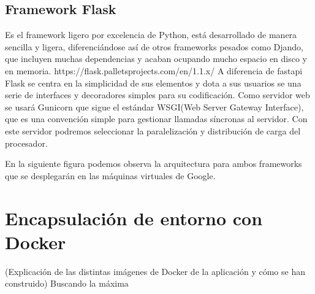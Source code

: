 \subsection{Framework Flask}\label{subsec:framework-flask}
Es el framework ligero por excelencia de Python, está desarrollado de manera sencilla y ligera, diferenciándose así de otros frameworks pesados como Djando, que incluyen
muchas dependencias y acaban ocupando mucho espacio en disco y en memoria.
https://flask.palletsprojects.com/en/1.1.x/
A diferencia de fastapi Flask se centra en la simplicidad de sus elementos y dota a sus usuarios se una serie de interfaces y decoradores simples para su codificación.
Como servidor web se usará Gunicorn que sigue el estándar WSGI(Web Server Gateway Interface), que es una convención simple para gestionar llamadas síncronas al servidor.
Con este servidor podremos seleccionar la paralelización y distribución de carga del procesador.

En la siguiente figura podemos observa la arquitectura para ambos frameworks que se desplegarán en las máquinas virtuales de Google.
\section{Encapsulación de entorno con Docker}\label{sec:encapsulación-de-entorno-con-docker}
(Explicación de las distintas imágenes de Docker de la aplicación y cómo se han construido)
Buscando la máxima